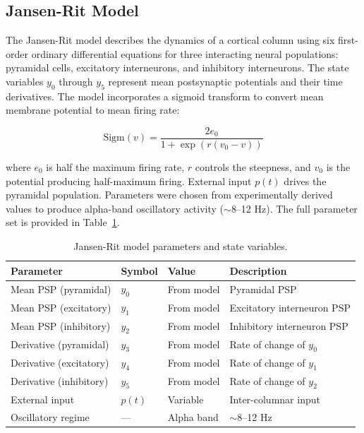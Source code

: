 \documentclass[12pt]{article}
\begin{document}
\subsection{Jansen-Rit Model}

The Jansen-Rit model describes the dynamics of a cortical column using six first-order ordinary differential equations for three interacting neural populations: pyramidal cells, excitatory interneurons, and inhibitory interneurons. The state variables $y_0$ through $y_5$ represent mean postsynaptic potentials and their time derivatives. The model incorporates a sigmoid transform to convert mean membrane potential to mean firing rate:

\begin{equation}
\text{Sigm}(v) = \frac{2e_0}{1 + \exp(r(v_0 - v))}
\end{equation}

\noindent where $e_0$ is half the maximum firing rate, $r$ controls the steepness, and $v_0$ is the potential producing half-maximum firing. External input $p(t)$ drives the pyramidal population. Parameters were chosen from experimentally derived values to produce alpha-band oscillatory activity ($\sim$8--12 Hz). The full parameter set is provided in Table~\ref{tab:jr_params}.

\begin{table}[H]
\centering
\caption{Jansen-Rit model parameters and state variables.}
\label{tab:jr_params}
\begin{tabular}{llll}
\toprule
Parameter & Symbol & Value & Description \\
\midrule
Mean PSP (pyramidal) & $y_0$ & From model & Pyramidal PSP \\
Mean PSP (excitatory) & $y_1$ & From model & Excitatory interneuron PSP \\
Mean PSP (inhibitory) & $y_2$ & From model & Inhibitory interneuron PSP \\
Derivative (pyramidal) & $y_3$ & From model & Rate of change of $y_0$ \\
Derivative (excitatory) & $y_4$ & From model & Rate of change of $y_1$ \\
Derivative (inhibitory) & $y_5$ & From model & Rate of change of $y_2$ \\
External input & $p(t)$ & Variable & Inter-columnar input \\
Oscillatory regime & --- & Alpha band & $\sim$8--12 Hz \\
\bottomrule
\end{tabular}
\end{table}
\end{document}
